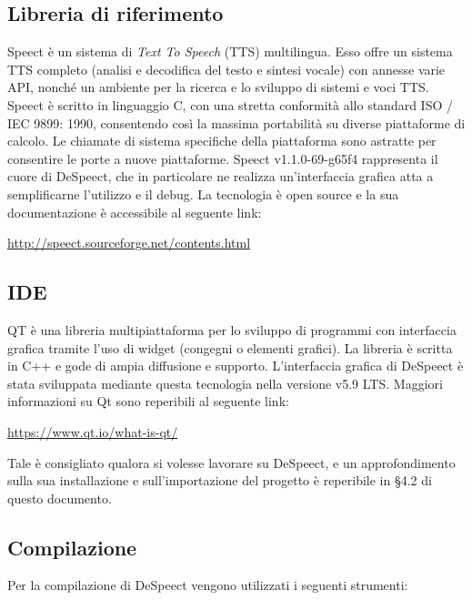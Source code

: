\documentclass[openany,12pt,a4paper]{report}
\begin{document}
	\subsection{Libreria di riferimento}
	Speect è un sistema di \textit{Text To Speech} (TTS) multilingua. Esso offre un sistema TTS completo (analisi e decodifica del testo e sintesi vocale) con annesse varie API, nonché un ambiente per la ricerca e lo sviluppo di sistemi e voci TTS. Speect è scritto in linguaggio C, con una stretta conformità allo standard ISO / IEC 9899: 1990, consentendo così la massima portabilità su diverse piattaforme di calcolo. Le chiamate di sistema specifiche della piattaforma sono astratte per consentire le porte a nuove piattaforme. Speect v1.1.0-69-g65f4 rappresenta il cuore di DeSpeect, che in particolare ne realizza un'interfaccia grafica atta a semplificarne l'utilizzo e il debug. La tecnologia è open source e la sua documentazione è accessibile al seguente link:
	\begin{center}
	\url{http://speect.sourceforge.net/contents.html}
	\end{center}
	
	\subsection{IDE}
	
	QT è una libreria multipiattaforma per lo sviluppo di programmi con interfaccia grafica tramite l'uso di widget (congegni o elementi grafici). La libreria è scritta in C++ e gode di ampia diffusione e supporto. L'interfaccia grafica di DeSpeect è stata sviluppata mediante questa tecnologia nella versione v5.9 LTS. Maggiori informazioni su Qt sono reperibili al seguente link:
	\begin{center}
	\centerline{\url{https://www.qt.io/what-is-qt/}}
	\end{center}
	Tale  è consigliato qualora si volesse lavorare su DeSpeect, e un approfondimento sulla sua installazione e sull'importazione del progetto è reperibile in §4.2 di questo documento. 
	
	\subsection{Compilazione}
	
	Per la compilazione di DeSpeect vengono utilizzati i seguenti strumenti:
	
\end{document}
